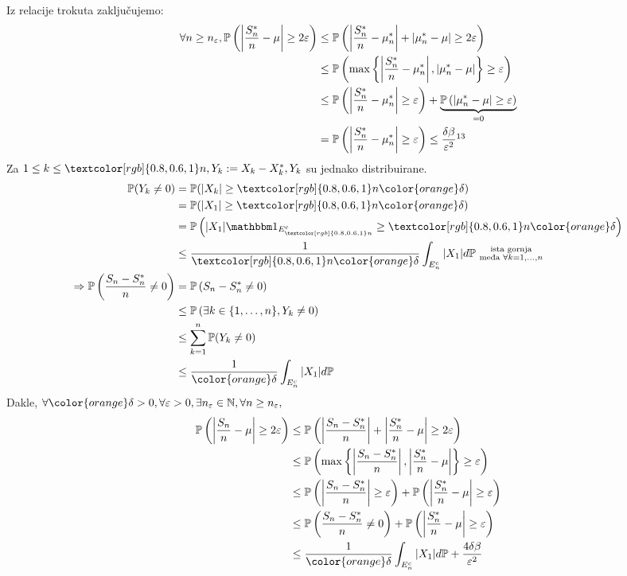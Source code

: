 \documentclass{article}
\begin{document}
Iz relacije trokuta zaključujemo: \[\begin{aligned}\forall n\ge n_\varepsilon,\Bbb P\left(\left|\frac{S^*_n}n-\mu\right|\ge 2\varepsilon\right)&\le\Bbb P\left(\left|\frac{S^*_n}n-\mu^*_n\right|+|\mu^*_n-\mu|\ge2\varepsilon\right)\\&\le\Bbb P\left(\max\left\{\left|\frac{S^*_n}n-\mu^*_n\right|,|\mu^*_n-\mu|\right\}\ge\varepsilon\right)\\&\le\Bbb P\left(\left|\frac{S^*_n}n-\mu^*_n\right|\ge\varepsilon\right)+\underbrace{\Bbb P\left(|\mu^*_n-\mu|\ge\varepsilon\right)}_{=0}\\&=\Bbb P\left(\left|\frac{S^*_n}n-\mu^*_n\right|\ge\varepsilon\right)\le\frac{\delta\beta}{\varepsilon^2}\footnotemark[13]\end{aligned}\] Za \(1\le k\le{\textcolor[rgb]{0.8,0.6,1}n}, Y_k:=X_k-X^*_k, Y_k\) su jednako distribuirane. \[\begin{aligned}\Bbb P(Y_k\ne 0)&=\Bbb P(|X_k|\ge {\textcolor[rgb]{0.8,0.6,1}n}{\color{orange}\delta})\\&=\Bbb P(|X_1|\ge {\textcolor[rgb]{0.8,0.6,1}n}{\color{orange}\delta})\\&=\Bbb P\left(|X_1|\mathbbm 1_{E^c_{\textcolor[rgb]{0.8,0.6,1}n}}\ge {\textcolor[rgb]{0.8,0.6,1}n}{\color{orange}\delta}\right)\\&\le\frac1{{\textcolor[rgb]{0.8,0.6,1}n}{\color{orange}\delta}}\int_{E_n^c}|X_1|d\Bbb P\text{ }\substack{\text{ista gornja}\\\text{me\dj{}a }\forall k=1,\ldots,n}\\\Rightarrow\Bbb P\left(\frac{S_n-S_n^*}n\ne 0\right)&=\Bbb P\left(S_n-S_n^*\ne 0\right)\\&\le\Bbb P\left(\exists k\in\{1,\ldots,n\},Y_k\ne0\right)\\&\le\sum_{k=1}^n\Bbb P(Y_k\ne0)\\&\le\frac1{\color{orange}\delta}\int_{E_n^c}|X_1|d\Bbb P\end{aligned}\] Dakle, \(\forall {\color{orange}\delta>0},\forall\varepsilon>0,\exists n_\varepsilon\in\Bbb N,\forall n\ge n_\varepsilon,\) \[\begin{aligned}\Bbb P\left(\left|\frac{S_n}n-\mu\right|\ge2\varepsilon\right)&\le\Bbb P\left(\left|\frac{S_n-S^*_n}n\right|+\left|\frac{S^*_n}n-\mu\right|\ge2\varepsilon\right)\\&\le\Bbb P\left(\max\left\{\left|\frac{S_n-S^*_n}n\right|,\left|\frac{S^*_n}n-\mu\right|\right\}\ge\varepsilon\right)\\&\le\Bbb P\left(\left|\frac{S_n-S^*_n}n\right|\ge\varepsilon\right)+\Bbb P\left(\left|\frac{S^*_n}n-\mu\right|\ge\varepsilon\right)\\&\le\Bbb P\left(\frac{S_n-S^*_n}n\ne 0\right)+\Bbb P\left(\left|\frac{S^*_n}n-\mu\right|\ge\varepsilon\right)\\&\le\frac1{\color{orange}\delta}\int_{E_n^c}|X_1|d\Bbb P+\frac{4\delta\beta}{\varepsilon^2}\end{aligned}\]
\end{document}
